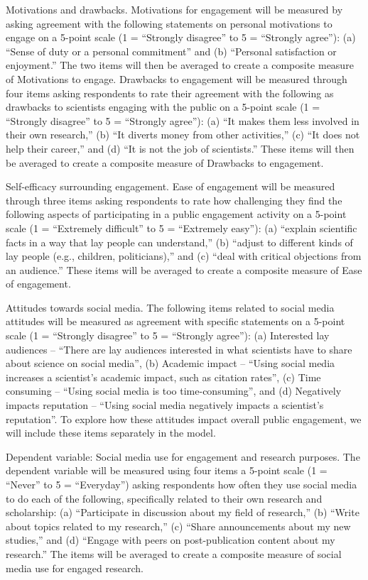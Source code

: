 \documentclass[12pt,]{article}
\begin{document}
Motivations and drawbacks. Motivations for engagement will be measured by asking agreement with the following statements on personal motivations to engage on a 5-point scale (1 = ``Strongly disagree'' to 5 = ``Strongly agree''): (a) ``Sense of duty or a personal commitment'' and (b) ``Personal satisfaction or enjoyment.'' The two items will then be averaged to create a composite measure of Motivations to engage. Drawbacks to engagement will be measured through four items asking respondents to rate their agreement with the following as drawbacks to scientists engaging with the public on a 5-point scale (1 = ``Strongly disagree'' to 5 = ``Strongly agree''): (a) ``It makes them less involved in their own research,'' (b) ``It diverts money from other activities,'' (c) ``It does not help their career,'' and (d) ``It is not the job of scientists.'' These items will then be averaged to create a composite measure of Drawbacks to engagement.

Self-efficacy surrounding engagement. Ease of engagement will be measured through three items asking respondents to rate how challenging they find the following aspects of participating in a public engagement activity on a 5-point scale (1 = ``Extremely difficult'' to 5 = ``Extremely easy''): (a) ``explain scientific facts in a way that lay people can understand,'' (b) ``adjust to different kinds of lay people (e.g., children, politicians),'' and (c) ``deal with critical objections from an audience.'' These items will be averaged to create a composite measure of Ease of engagement.

Attitudes towards social media. The following items related to social media attitudes will be measured as agreement with specific statements on a 5-point scale (1 = ``Strongly disagree'' to 5 = ``Strongly agree''): (a) Interested lay audiences -- ``There are lay audiences interested in what scientists have to share about science on social media'', (b) Academic impact -- ``Using social media increases a scientist's academic impact, such as citation rates'', (c) Time consuming -- ``Using social media is too time-consuming'', and (d) Negatively impacts reputation -- ``Using social media negatively impacts a scientist's reputation''. To explore how these attitudes impact overall public engagement, we will include these items separately in the model.

Dependent variable: Social media use for engagement and research purposes. The dependent variable will be measured using four items a 5-point scale (1 = ``Never'' to 5 = ``Everyday'') asking respondents how often they use social media to do each of the following, specifically related to their own research and scholarship: (a) ``Participate in discussion about my field of research,'' (b) ``Write about topics related to my research,'' (c) ``Share announcements about my new studies,'' and (d) ``Engage with peers on post-publication content about my research.'' The items will be averaged to create a composite measure of social media use for engaged research.
\end{document}
